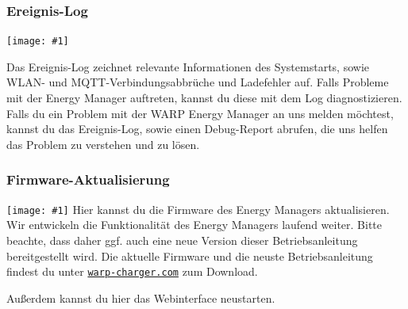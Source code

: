 \documentclass[a4paper,10pt]{article}
\newcommand{\gfx}[1]{\texttt{[image: \#1]}}
\newcommand\rurl[2]{%
  \href{#1}{\nolinkurl{#2}}%
}
\begin{document}
\begin{multicols*}{2}
	\subsubsection{Ereignis-Log}
	\gfx{./img/resized/web_event_log}

	Das Ereignis-Log zeichnet relevante Informationen des Systemstarts, sowie WLAN- und MQTT-Verbindungsabbrüche und Ladefehler auf.
	Falls Probleme mit der Energy Manager auftreten, kannst du diese mit dem Log diagnostizieren.
	Falls du ein Problem mit der WARP Energy Manager an uns melden möchtest, kannst du das Ereignis-Log,
	sowie einen Debug-Report abrufen, die uns helfen das Problem zu verstehen und zu lösen.

	\subsubsection{Firmware-Aktualisierung}
	\label{firmware-update}
	\gfx{./img/resized/web_firmware_update}
	Hier kannst du die Firmware des Energy Managers aktualisieren. Wir entwickeln die Funktionalität
	des Energy Managers laufend weiter. Bitte beachte, dass daher ggf. auch eine neue
	Version dieser Betriebsanleitung bereitgestellt wird.
	Die aktuelle Firmware und die neuste Betriebsanleitung findest du unter
	\rurl{https://warp-charger.com}{warp-charger.com} zum Download.

	Außerdem kannst du hier das Webinterface neustarten.


\end{multicols*}
\end{document}
